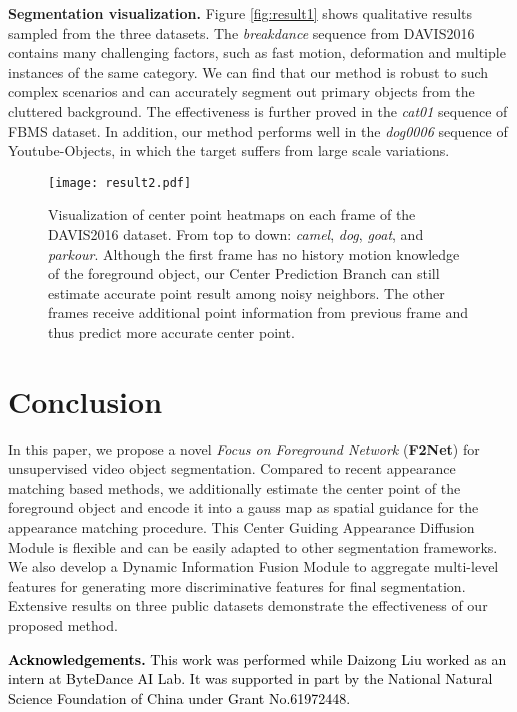 \documentclass[letterpaper]{article} \usepackage{aaai20}  \usepackage{times}  \usepackage{helvet} \usepackage{courier}  \usepackage[hyphens]{url}  \usepackage{graphicx} \urlstyle{rm} \def\UrlFont{\rm}  \usepackage{graphicx}  \frenchspacing  \setlength{\pdfpagewidth}{8.5in}  \setlength{\pdfpageheight}{11in}  \usepackage{amssymb}
\newcommand{\ldz}[1]{\textcolor{black}{#1}}
\begin{document}
\noindent \textbf{Segmentation visualization.} Figure \ref{fig:result1} shows qualitative results sampled from the three datasets. The \textit{breakdance} sequence from DAVIS2016 contains many challenging factors, such as fast motion, deformation and multiple instances of the same category. We can find that our method is robust to such complex scenarios and can accurately segment out primary objects from the cluttered background. The effectiveness is further proved in the \textit{cat01} sequence of FBMS dataset. In addition, our method performs well in the \textit{dog0006} sequence of Youtube-Objects, in which the target suffers from large scale variations.

\begin{figure}[t!]
\centering
\texttt{[image: result2.pdf]}
\caption{Visualization of center point heatmaps on each frame of the DAVIS2016 dataset. From top to down: \textit{camel}, \textit{dog}, \textit{goat}, and \textit{parkour}. Although the first frame has no history motion knowledge of the foreground object, our Center Prediction Branch can still estimate accurate point result among noisy neighbors. The other frames receive additional point information from previous frame and thus predict more accurate center point.}
\label{fig:result2}
\vspace{-12pt}
\end{figure}

\section{Conclusion}
In this paper, we propose a novel \textit{Focus on Foreground Network} (\textbf{F2Net}) for unsupervised video object segmentation. Compared to recent appearance matching based methods, we additionally estimate the center point of the foreground object and encode it into a gauss map as spatial guidance for the appearance matching procedure. This Center Guiding Appearance Diffusion Module is flexible and can be easily adapted to other segmentation frameworks. We also develop a Dynamic Information Fusion Module to aggregate multi-level features for generating more discriminative features for final segmentation. Extensive results on three public datasets demonstrate the effectiveness of our proposed method.

\clearpage
\noindent \ldz{\textbf{Acknowledgements.} This work was performed while Daizong Liu worked as an intern at ByteDance AI Lab. It was supported in part by the National Natural Science Foundation of China under Grant No.61972448.}



\end{document}
